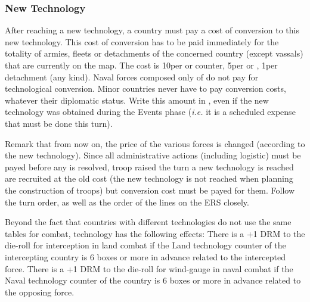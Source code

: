 \subsubsection{New Technology}
 After reaching a new technology, a country
must pay a cost of conversion to this new technology.
\bparag This cost of conversion has to be paid immediately for the totality of
armies, fleets or detachments of the concerned country (except vassals) that
are currently on the map.
\bparag The cost is 10\ducats per \ARMY\faceplus or \FLEET\faceplus counter,
5\ducats per \ARMY\facemoins or \FLEET\facemoins, 1\ducats per detachment (any
kind).
\bparag Naval forces composed only of \NGD do not pay for technological
conversion.
\bparag Minor countries never have to pay conversion costs, whatever their
diplomatic status.
\bparag Write this amount in , even if the new
technology was obtained during the Events phase (\emph{i.e.} it is a scheduled
expense that must be done this turn).

\aparag Remark that from now on, the price of the various forces is changed
(according to the new technology).
\bparag Since all administrative actions (including logistic) must be payed
before any is resolved, troop raised the turn a new technology is reached are
recruited at the old cost (the new technology is not reached when planning the
construction of troops) but conversion cost must be payed for them. Follow the
turn order, as well as the order of the lines on the ERS closely.

 Beyond the fact that countries with different
technologies do not use the same tables for combat, technology has the
following effects:
\bparag There is a +1 DRM to the die-roll for interception in land combat if
the Land technology counter of the intercepting country is 6 boxes or more in
advance related to the intercepted force.
\bparag There is a +1 DRM to the die-roll for wind-gauge in naval combat if
the Naval technology counter of the country is 6 boxes or more in advance
related to the opposing force.

